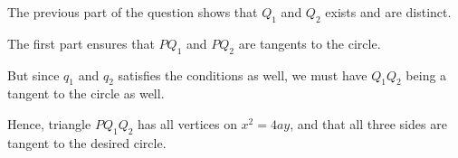 \begin{enumerate}
          The previous part of the question shows that \(Q_1\) and \(Q_2\) exists and are distinct.

          The first part ensures that \(PQ_1\) and \(PQ_2\) are tangents to the circle.

          But since \(q_1\) and \(q_2\) satisfies the conditions as well, we must have \(Q_1 Q_2\) being a tangent to the circle as well.

          Hence, triangle \(P Q_1 Q_2\) has all vertices on \(x^2 = 4ay\), and that all three sides are tangent to the desired circle.
\end{enumerate}